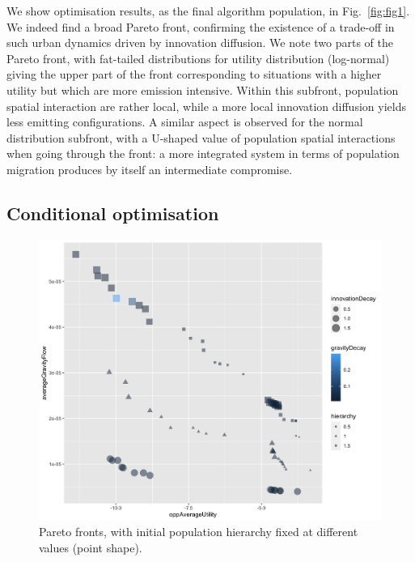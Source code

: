 \documentclass{article}
\begin{document}
We show optimisation results, as the final algorithm population, in Fig.~\ref{fig:fig1}. We indeed find a broad Pareto front, confirming the existence of a trade-off in such urban dynamics driven by innovation diffusion. We note two parts of the Pareto front, with fat-tailed distributions for utility distribution (log-normal) giving the upper part of the front corresponding to situations with a higher utility but which are more emission intensive. Within this subfront, population spatial interaction are rather local, while a more local innovation diffusion yields less emitting configurations. A similar aspect is observed for the normal distribution subfront, with a U-shaped value of population spatial interactions when going through the front: a more integrated system in terms of population migration produces by itself an intermediate compromise.






\subsection{Conditional optimisation}




\begin{figure}
	\centering
	\includegraphics[width=\linewidth]{figures/pareto-oppAverageUtility-averageGravityFlow_VARYINGHIERARCHY_color-gravityDecay_size-innovationDecay.png}
	\caption{Pareto fronts, with initial population hierarchy fixed at different values (point shape).\label{fig:fig2}}
\end{figure}
\end{document}
